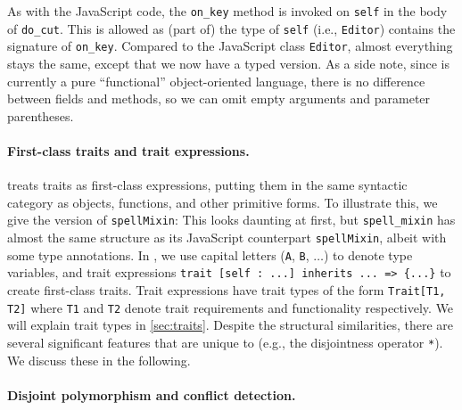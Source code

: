 As with the JavaScript code, the \lstinline{on_key} method is invoked on
\lstinline{self} in the body of \lstinline{do_cut}. This is allowed as (part of)
the type of \lstinline{self} (i.e., \lstinline{Editor}) contains the signature
of \lstinline{on_key}. Compared to the JavaScript class
\lstinline{Editor}, almost everything stays the same, except that we now have
a typed version. As a side note, since \sedel is currently a pure ``functional'' object-oriented
language, there is no difference between fields and methods, so we can omit
empty arguments and parameter parentheses.

\paragraph{First-class traits and trait expressions.}

\sedel treats traits as first-class expressions, putting them in the same
syntactic category as objects, functions, and other primitive forms. To
illustrate this, we give the \sedel version of \lstinline{spellMixin}:
This looks daunting at first, but \lstinline{spell_mixin} has almost the same structure as
its JavaScript counterpart \lstinline{spellMixin}, albeit with
some type annotations. In \sedel, we use capital letters (\lstinline{A}, \lstinline{B}, $\dots$) to denote type variables, and trait
expressions \lstinline$trait [self : ...] inherits ... => {...}$ to create
first-class traits. Trait expressions have trait
types of the form \lstinline{Trait[T1, T2]} where \lstinline{T1} and \lstinline{T2} denote trait requirements and functionality respectively.
We will explain trait types in \cref{sec:traits}. Despite the structural similarities, there are several significant
features that are unique to \sedel (e.g., the disjointness operator \lstinline{*}).
We discuss these in the following.



\paragraph{Disjoint polymorphism and conflict detection.}


